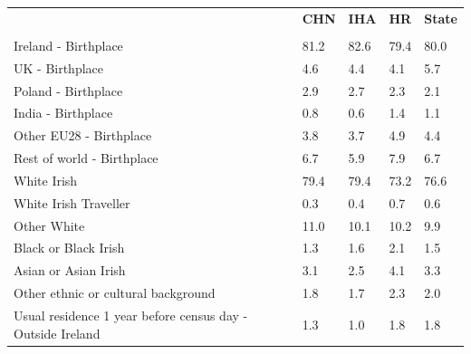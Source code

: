 \documentclass{article}
\begin{document}
\pagebreak
\begin{table}[h]	
\centering
		\begin{tabular}{KTTTT}
  \hline
& \textbf{CHN} & \textbf{IHA} & \textbf{HR}& \textbf{State}\\ 
  \hline
    \\ 
    \hline
Ireland - Birthplace & 81.2& 82.6& 79.4& 80.0\\
UK - Birthplace & 4.6& 4.4& 4.1& 5.7\\
Poland - Birthplace & 2.9& 2.7& 2.3& 2.1\\
India - Birthplace & 0.8& 0.6& 1.4& 1.1\\
Other EU28 - Birthplace & 3.8& 3.7& 4.9& 4.4\\
Rest of world - Birthplace & 6.7& 5.9& 7.9& 6.7\\
    \hline
White Irish & 79.4& 79.4& 73.2& 76.6\\
White Irish Traveller & 0.3& 0.4& 0.7& 0.6\\
Other White & 11.0& 10.1& 10.2&  9.9\\
Black or Black Irish & 1.3& 1.6& 2.1& 1.5\\
Asian or Asian Irish & 3.1& 2.5& 4.1& 3.3\\
Other ethnic or cultural background & 1.8& 1.7& 2.3& 2.0\\
    \hline
Usual residence 1 year before census day - Outside Ireland & 1.3& 1.0& 1.8& 1.8\\


\end{tabular}
\end{table}
\end{document}
